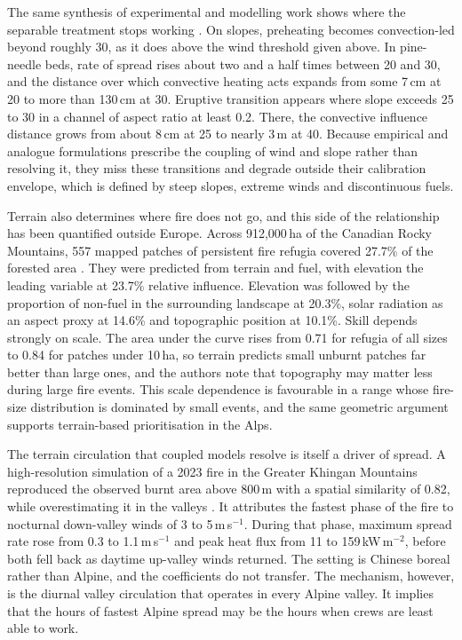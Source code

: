\documentclass[11pt,a4paper]{article}
\begin{document}
The same synthesis of experimental and modelling work shows where the separable treatment stops working \citep{hayajneh_wind_2026}. On slopes, preheating becomes convection-led beyond roughly 30\degree{}, as it does above the wind threshold given above. In pine-needle beds, rate of spread rises about two and a half times between 20\degree{} and 30\degree{}, and the distance over which convective heating acts expands from some 7\,cm at 20\degree{} to more than 130\,cm at 30\degree{}. Eruptive transition appears where slope exceeds 25\degree{} to 30\degree{} in a channel of aspect ratio at least 0.2. There, the convective influence distance grows from about 8\,cm at 25\degree{} to nearly 3\,m at 40\degree{}. Because empirical and analogue formulations prescribe the coupling of wind and slope rather than resolving it, they miss these transitions and degrade outside their calibration envelope, which is defined by steep slopes, extreme winds and discontinuous fuels.

Terrain also determines where fire does not go, and this side of the relationship has been quantified outside Europe. Across 912{,}000\,ha of the Canadian Rocky Mountains, 557 mapped patches of persistent fire refugia covered 27.7\% of the forested area \citep{rogeau_effect_2018}. They were predicted from terrain and fuel, with elevation the leading variable at 23.7\% relative influence. Elevation was followed by the proportion of non-fuel in the surrounding landscape at 20.3\%, solar radiation as an aspect proxy at 14.6\% and topographic position at 10.1\%. Skill depends strongly on scale. The area under the curve rises from 0.71 for refugia of all sizes to 0.84 for patches under 10\,ha, so terrain predicts small unburnt patches far better than large ones, and the authors note that topography may matter less during large fire events. This scale dependence is favourable in a range whose fire-size distribution is dominated by small events, and the same geometric argument supports terrain-based prioritisation in the Alps.

The terrain circulation that coupled models resolve is itself a driver of spread. A high-resolution simulation of a 2023 fire in the Greater Khingan Mountains reproduced the observed burnt area above 800\,m with a spatial similarity of 0.82, while overestimating it in the valleys \citep{wang_dynamic_2026}. It attributes the fastest phase of the fire to nocturnal down-valley winds of 3 to 5\,m\,s$^{-1}$. During that phase, maximum spread rate rose from 0.3 to 1.1\,m\,s$^{-1}$ and peak heat flux from 11 to 159\,kW\,m$^{-2}$, before both fell back as daytime up-valley winds returned. The setting is Chinese boreal rather than Alpine, and the coefficients do not transfer. The mechanism, however, is the diurnal valley circulation that operates in every Alpine valley. It implies that the hours of fastest Alpine spread may be the hours when crews are least able to work.
\end{document}
